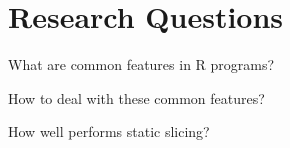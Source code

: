 \section[RQs]{Research Questions}
\begin{frame}[c]{\insertsection}
   \begin{description}
      \itemsep12pt
      \item<2->[RQ1:] 
      \item<4->[RQ2:] What are common features in R programs?
      \item<5->[RQ3:] How to deal with these common features?
      \item<6->[RQ4:] How well performs static slicing?
   \end{description}
\end{frame}